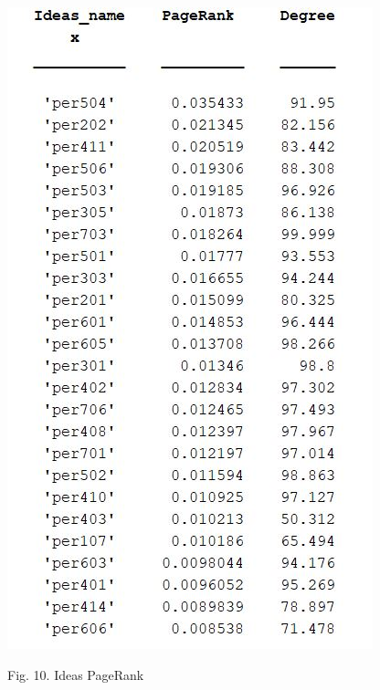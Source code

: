 \documentclass{article}%
\begin{document}
\begin{center}
\includegraphics[scale=0.5]{PageRank_ideas}

\begin{small}
Fig. 10. Ideas PageRank
\end{small}
\end{center}
\end{document}
